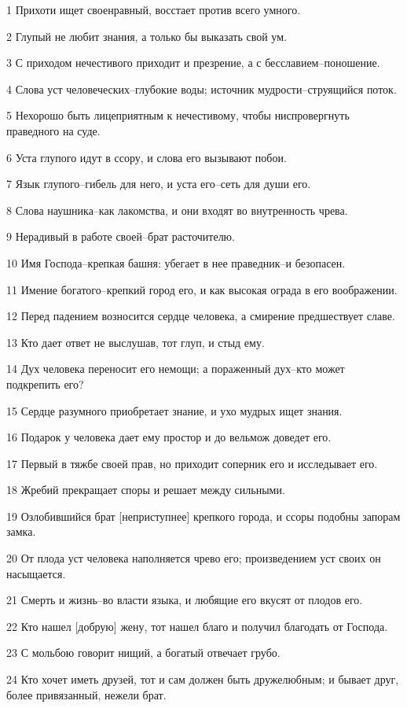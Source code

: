 \par 1 Прихоти ищет своенравный, восстает против всего умного.
\par 2 Глупый не любит знания, а только бы выказать свой ум.
\par 3 С приходом нечестивого приходит и презрение, а с бесславием--поношение.
\par 4 Слова уст человеческих--глубокие воды; источник мудрости--струящийся поток.
\par 5 Нехорошо быть лицеприятным к нечестивому, чтобы ниспровергнуть праведного на суде.
\par 6 Уста глупого идут в ссору, и слова его вызывают побои.
\par 7 Язык глупого--гибель для него, и уста его--сеть для души его.
\par 8 Слова наушника--как лакомства, и они входят во внутренность чрева.
\par 9 Нерадивый в работе своей--брат расточителю.
\par 10 Имя Господа--крепкая башня: убегает в нее праведник--и безопасен.
\par 11 Имение богатого--крепкий город его, и как высокая ограда в его воображении.
\par 12 Перед падением возносится сердце человека, а смирение предшествует славе.
\par 13 Кто дает ответ не выслушав, тот глуп, и стыд ему.
\par 14 Дух человека переносит его немощи; а пораженный дух--кто может подкрепить его?
\par 15 Сердце разумного приобретает знание, и ухо мудрых ищет знания.
\par 16 Подарок у человека дает ему простор и до вельмож доведет его.
\par 17 Первый в тяжбе своей прав, но приходит соперник его и исследывает его.
\par 18 Жребий прекращает споры и решает между сильными.
\par 19 Озлобившийся брат [неприступнее] крепкого города, и ссоры подобны запорам замка.
\par 20 От плода уст человека наполняется чрево его; произведением уст своих он насыщается.
\par 21 Смерть и жизнь--во власти языка, и любящие его вкусят от плодов его.
\par 22 Кто нашел [добрую] жену, тот нашел благо и получил благодать от Господа.
\par 23 С мольбою говорит нищий, а богатый отвечает грубо.
\par 24 Кто хочет иметь друзей, тот и сам должен быть дружелюбным; и бывает друг, более привязанный, нежели брат.

